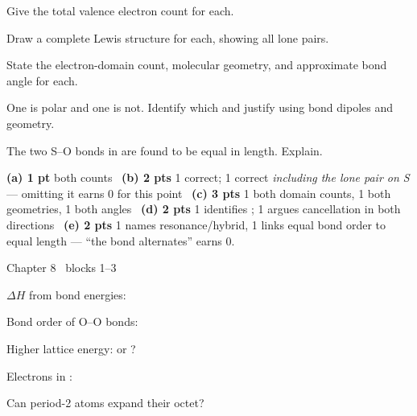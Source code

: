 \documentclass{apchem-worksheet}
\begin{document}
\begin{parts}
  \item Give the total valence electron count for each.
  \item Draw a complete Lewis structure for each, showing all lone pairs.
        \workspace[3.2cm]
  \item State the electron-domain count, molecular geometry, and
        approximate bond angle for each.
  \item One is polar and one is not. Identify which and justify using bond
        dipoles and geometry. 
  \item The two S--O bonds in  are found to be equal in length.
        Explain. 
\end{parts}

\begin{apcnote}
\textbf{(a) 1 pt} both counts \textbullet\ \textbf{(b) 2 pts} 1 
correct; 1  correct \emph{including the lone pair on S} --- omitting
it earns 0 for this point \textbullet\ \textbf{(c) 3 pts} 1 both domain
counts, 1 both geometries, 1 both angles \textbullet\ \textbf{(d) 2 pts}
1 identifies ; 1 argues cancellation in both directions
\textbullet\ \textbf{(e) 2 pts} 1 names resonance/hybrid, 1 links equal
bond order to equal length --- ``the bond alternates'' earns 0.
\end{apcnote}

\begin{spiralstrip}{Chapter 8 \textbullet\ blocks 1--3}
  \item $\Delta H$ from bond energies:
  \item Bond order of  O--O bonds: 
  \item Higher lattice energy:  or ?
  \item Electrons in : 
  \item Can period-2 atoms expand their octet? 
\end{spiralstrip}
\end{document}
